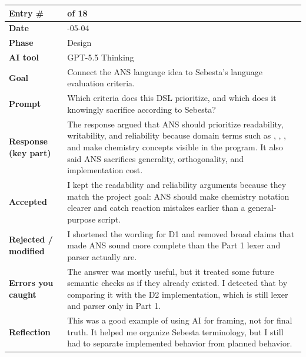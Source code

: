 \documentclass[11pt,a4paper]{article}
\newcommand{\code}[1]{\texttt{\detokenize{#1}}}
\newcommand{\entrygap}{\vspace{8pt}}
\newenvironment{journalentry}{%
  \begin{center}\small\renewcommand{\arraystretch}{1.22}%
  \begin{tabular}{|>{\columncolor{anscodebg}\bfseries}p{3.0cm}|>{\RaggedRight\arraybackslash}p{12.25cm}|}%
  \hline
}{%
  \end{tabular}\end{center}\entrygap
}
\begin{document}
\begin{journalentry}
Entry \# & 1 of 18 \\ \hline
Date & 2026-05-04 \\ \hline
Phase & Design \\ \hline
AI tool & GPT-5.5 Thinking \\ \hline
Goal & Connect the ANS language idea to Sebesta's language evaluation criteria. \\ \hline
Prompt & Which criteria does this DSL prioritize, and which does it knowingly sacrifice according to Sebesta? \\ \hline
Response (key part) & The response argued that ANS should prioritize readability, writability, and reliability because domain terms such as \code{element}, \code{compound}, \code{reaction}, and \code{check = balanced} make chemistry concepts visible in the program. It also said ANS sacrifices generality, orthogonality, and implementation cost. \\ \hline
Accepted & I kept the readability and reliability arguments because they match the project goal: ANS should make chemistry notation clearer and catch reaction mistakes earlier than a general-purpose script. \\ \hline
Rejected / modified & I shortened the wording for D1 and removed broad claims that made ANS sound more complete than the Part 1 lexer and parser actually are. \\ \hline
Errors you caught & The answer was mostly useful, but it treated some future semantic checks as if they already existed. I detected that by comparing it with the D2 implementation, which is still lexer and parser only in Part 1. \\ \hline
Reflection & This was a good example of using AI for framing, not for final truth. It helped me organize Sebesta terminology, but I still had to separate implemented behavior from planned behavior. \\ \hline
\end{journalentry}
\end{document}
